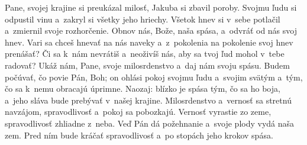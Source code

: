 Pane, svojej krajine si preukázal milosť,
Jakuba si zbavil poroby.
\versseparator
Svojmu ľudu si odpustil vinu
a~zakryl si všetky jeho hriechy.
\versseparator
Všetok hnev si v~sebe potlačil
a~zmiernil svoje rozhorčenie.
\versseparator
Obnov nás, Bože, naša spása,
a~odvráť od nás svoj hnev.
\versseparator
Vari sa chceš hnevať na nás naveky
a~z~pokolenia na pokolenie svoj hnev prenášať?
\versseparator
Či sa k~nám nevrátiš a~neoživíš nás,
aby sa tvoj ľud mohol v~tebe radovať?
\versseparator
Ukáž nám, Pane, svoje milosrdenstvo
a~daj nám svoju spásu.
\versseparator
Budem počúvať, čo povie Pán, Boh;
on ohlási pokoj svojmu ľudu 
\versseparator
a~svojim svätým
a~tým, čo sa k~nemu obracajú úprimne.
\versseparator
Naozaj: blízko je spása tým, čo sa ho boja,
a~jeho sláva bude prebývať v~našej krajine.
\versseparator
Milosrdenstvo a~vernosť sa stretnú navzájom,
spravodlivosť a~pokoj sa pobozkajú.
\versseparator
Vernosť vyrastie zo zeme,
spravodlivosť zhliadne z~neba.
\versseparator
Veď Pán dá požehnanie
a~svoje plody vydá naša zem.
\versseparator
Pred ním bude kráčať spravodlivosť
a~po stopách jeho krokov spása.